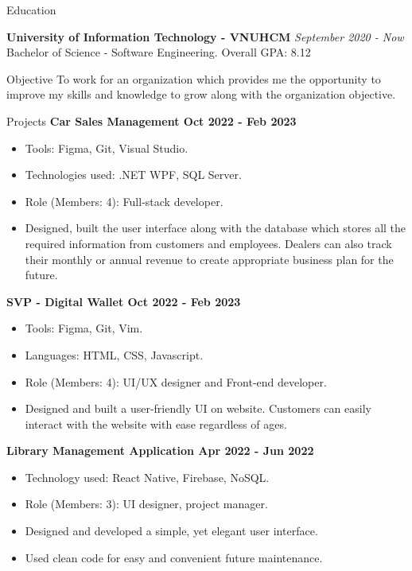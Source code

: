 \documentclass{resume}
\begin{document}
\begin{rSection}{Education}

{\bf University of Information Technology - VNUHCM} \hfill {\em September 2020 - Now} 
\\ Bachelor of Science - Software Engineering.\hfill { Overall GPA: 8.12 }

\end{rSection}

\begin{rSection}{Objective}
 To work for an organization which provides me the opportunity to improve my skills and knowledge to grow along with the organization objective.
\end{rSection}

\begin{rSection}{Projects}
{\bf Car Sales Management \hfill{Oct 2022 - Feb 2023}}
\begin{itemize}
    \item Tools: Figma, Git, Visual Studio.
    \item Technologies used: .NET WPF, SQL Server.
    \item Role (Members: 4): Full-stack developer.
    \item Designed, built the user interface along with the database which stores all the required information from customers and employees. Dealers can also track their monthly or annual revenue to create appropriate business plan for the future. 
\end{itemize}


{\bf SVP - Digital Wallet \hfill{Oct 2022 - Feb 2023}}
\begin{itemize}
    \item Tools: Figma, Git, Vim.
    \item Languages: HTML, CSS, Javascript.
    \item Role (Members: 4): UI/UX designer and Front-end developer.
    \item Designed and built a user-friendly UI on website. Customers can easily interact with the website with ease regardless of ages. 
\end{itemize}

{\bf Library Management Application \hfill{Apr 2022 - Jun 2022}}
\begin{itemize}
    \item Technology used: React Native, Firebase, NoSQL.
    \item Role (Members: 3): UI designer, project manager.
    \item Designed and developed a simple, yet elegant user
    interface.
    \item Used clean code for easy and convenient future
    maintenance.    
\end{itemize}


\end{rSection}
\end{document}
